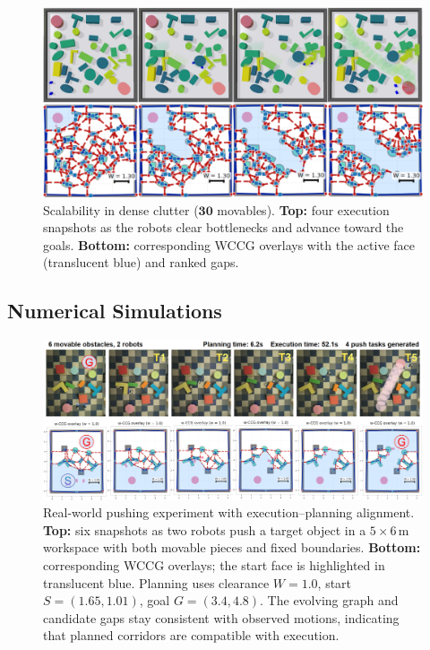 \begin{figure}[t!]
  \centering
  \includegraphics[width=0.95\linewidth]{figures/scalability.png}
  \vspace{-2mm}
 \caption{Scalability in dense clutter ($\boldsymbol{30}$ movables). 
  \textbf{Top:} four execution snapshots as the robots clear bottlenecks and advance toward the goals. 
  \textbf{Bottom:} corresponding WCCG overlays with the active face (translucent blue) and ranked gaps. 
  }
\label{fig:scalability}
\vspace{-4mm}
\end{figure}

\subsection{Numerical Simulations}
\label{subsec:sim}
\begin{figure}[t]
  \centering
  \includegraphics[width=0.95\linewidth]{figures/hardware_wccg.png}
  \vspace{-4mm}
  \caption{Real-world pushing experiment with execution--planning alignment. \textbf{Top:} six snapshots as two robots push a target object in a \(5{\times}6\,\mathrm{m}\) workspace with both movable pieces and fixed boundaries. \textbf{Bottom:} corresponding WCCG overlays; the start face is highlighted in translucent blue. Planning uses clearance \(W{=}1.0\), start \(S{=}(1.65,1.01)\), goal \(G{=}(3.4,4.8)\). The evolving graph and candidate gaps stay consistent with observed motions, indicating that planned corridors are compatible with execution.}
  \vspace{-4mm}
  \label{fig:hardware}
\end{figure}

